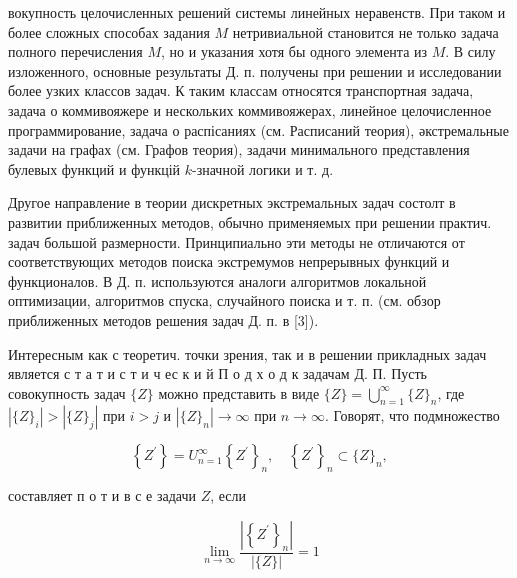 \documentclass[10pt]{article}
\begin{document}
вокупность целочисленных решений системы линейных неравенств. При таком и более сложных способах задания $M$ нетривиальной становится не только задача полного перечисления $M$, но и указания хотя бы одного элемента из $M$. В силу изложенного, основные результаты Д. п. получены при решении и исследовании более узких классов задач. К таким классам относятся транспортная задача, задача о коммивояжере и нескольких коммивояжерах, линейное целочисленное программирование, задача о распісаниях (см. Расписаний теория), әкстремальные задачи на графах (см. Графов теория), задачи минимального представления булевых функций и функцій $k$-значной логики и т. д.



Другое направление в теории дискретных экстремальных задач состолт в развитии приближенных методов, обычно применяемых при решении практич. задач большой размерности. Принципиально эти методы не отличаются от соответствующих методов поиска экстремумов непрерывных функций и функционалов. В Д. п. используются аналоги алгоритмов локальной оптимизации, алгоритмов спуска, случайного поиска и т. п. (см. обзор приближенных методов решения задач Д. п. в [3]).



Интересным как с теоретич. точки зрения, так и в решении прикладных задач является с т а т и с т и ч ес к и й П о д х о д к задачам Д. П. Пусть совокупность задач $\{Z\}$ можно представить в виде $\{Z\}=\bigcup_{n=1}^{\infty}\{Z\}_{n}$, где $\left|\{Z\}_{i}\right|>\left|\{Z\}_{j}\right|$ при $i>j$ и $\left|\{Z\}_{n}\right| \rightarrow \infty$ при $n \rightarrow \infty$. Говорят, что подмножество



\[

\left\{Z^{\prime}\right\}=U_{n=1}^{\infty}\left\{Z^{\prime}\right\}_{n}, \quad\left\{Z^{\prime}\right\}_{n} \subset\{Z\}_{n},

\]



составляет п о т и в с е задачи $Z$, если



\[

\lim _{n \rightarrow \infty} \frac{\left|\left\{Z^{\prime}\right\}_{n}\right|}{|\{Z\}|}=1

\]
\end{document}
